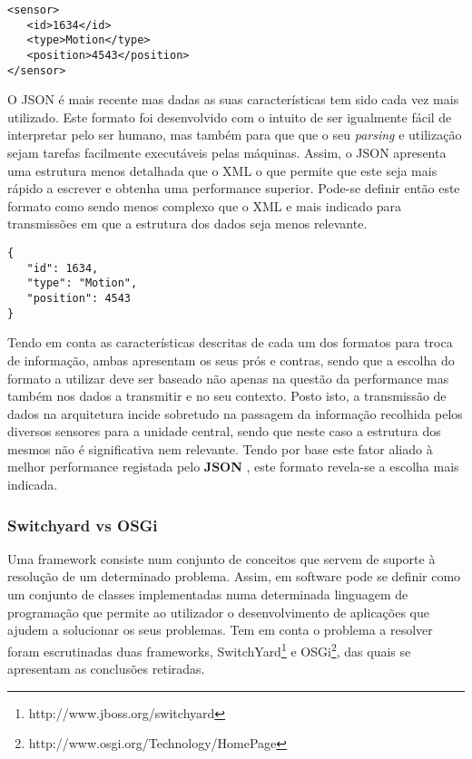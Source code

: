 \begin{lstlisting}[caption=Descrição de um sensor em XML]
<sensor>
   <id>1634</id>
   <type>Motion</type>
   <position>4543</position>
</sensor>
\end{lstlisting}



O JSON é mais recente mas dadas as suas características tem sido cada vez mais utilizado. Este formato foi desenvolvido com o intuito de ser igualmente fácil de interpretar pelo ser humano, mas também para que que o seu \textit{parsing} e utilização sejam tarefas facilmente executáveis pelas máquinas. Assim, o JSON apresenta uma estrutura menos detalhada que o XML o que permite que este seja mais rápido a escrever e obtenha uma performance superior. Pode-se definir então este formato como sendo menos complexo que o XML e mais indicado para transmissões em que a estrutura dos dados seja menos relevante.

\begin{lstlisting}[caption=Descrição de um sensor em JSON]
{
   "id": 1634,
   "type": "Motion",
   "position": 4543
}
\end{lstlisting}


Tendo em conta as características descritas de cada um dos formatos para troca de informação, ambas apresentam os seus prós e contras, sendo que a escolha do formato a utilizar deve ser baseado não apenas na questão da performance mas também nos dados a transmitir e no seu contexto. Posto isto, a transmissão de dados na arquitetura incide sobretudo na passagem da informação recolhida pelos diversos sensores para a unidade central, sendo que neste caso a estrutura dos mesmos não é significativa nem relevante. Tendo por base este fator aliado à melhor performance registada pelo \textbf{JSON} \cite{nurseitov2009comparison} , este formato revela-se a escolha mais indicada.


\subsubsection{Switchyard vs OSGi}

Uma framework consiste num conjunto de conceitos que servem de suporte à resolução de um determinado problema. Assim, em software pode se definir como um conjunto de classes implementadas numa determinada linguagem de programação que permite ao utilizador o desenvolvimento de aplicações que ajudem a solucionar os seus problemas. Tem em conta o problema a resolver foram escrutinadas duas frameworks, SwitchYard\footnote{http://www.jboss.org/switchyard} e OSGi\footnote{http://www.osgi.org/Technology/HomePage}, das quais se apresentam as conclusões retiradas.

